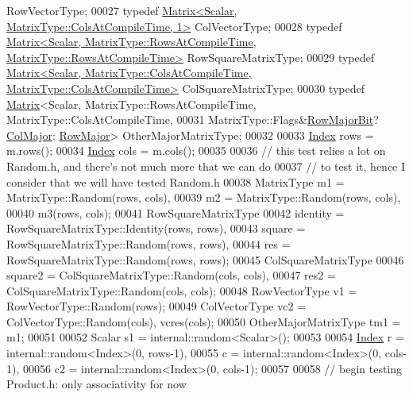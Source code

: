 \begin{DoxyCode}
      RowVectorType;
00027   \textcolor{keyword}{typedef} \hyperlink{group___core___module_class_eigen_1_1_matrix}{Matrix<Scalar, MatrixType::ColsAtCompileTime, 1>} 
      ColVectorType;
00028   \textcolor{keyword}{typedef} 
      \hyperlink{group___core___module_class_eigen_1_1_matrix}{Matrix<Scalar, MatrixType::RowsAtCompileTime, MatrixType::RowsAtCompileTime>}
       RowSquareMatrixType;
00029   \textcolor{keyword}{typedef} 
      \hyperlink{group___core___module_class_eigen_1_1_matrix}{Matrix<Scalar, MatrixType::ColsAtCompileTime, MatrixType::ColsAtCompileTime>}
       ColSquareMatrixType;
00030   \textcolor{keyword}{typedef} \hyperlink{group___core___module_class_eigen_1_1_matrix}{Matrix}<Scalar, MatrixType::RowsAtCompileTime, MatrixType::ColsAtCompileTime,
00031                          MatrixType::Flags&\hyperlink{group__flags_gae4f56c2a60bbe4bd2e44c5b19cbe8762}{RowMajorBit}?\hyperlink{group__enums_ggaacded1a18ae58b0f554751f6cdf9eb13a0cbd4bdd0abcfc0224c5fcb5e4f6669a}{ColMajor}:
      \hyperlink{group__enums_ggaacded1a18ae58b0f554751f6cdf9eb13acfcde9cd8677c5f7caf6bd603666aae3}{RowMajor}> OtherMajorMatrixType;
00032 
00033   \hyperlink{namespace_eigen_a62e77e0933482dafde8fe197d9a2cfde}{Index} rows = m.rows();
00034   \hyperlink{namespace_eigen_a62e77e0933482dafde8fe197d9a2cfde}{Index} cols = m.cols();
00035 
00036   \textcolor{comment}{// this test relies a lot on Random.h, and there's not much more that we can do}
00037   \textcolor{comment}{// to test it, hence I consider that we will have tested Random.h}
00038   MatrixType m1 = MatrixType::Random(rows, cols),
00039              m2 = MatrixType::Random(rows, cols),
00040              m3(rows, cols);
00041   RowSquareMatrixType
00042              identity = RowSquareMatrixType::Identity(rows, rows),
00043              square = RowSquareMatrixType::Random(rows, rows),
00044              res = RowSquareMatrixType::Random(rows, rows);
00045   ColSquareMatrixType
00046              square2 = ColSquareMatrixType::Random(cols, cols),
00047              res2 = ColSquareMatrixType::Random(cols, cols);
00048   RowVectorType v1 = RowVectorType::Random(rows);
00049   ColVectorType vc2 = ColVectorType::Random(cols), vcres(cols);
00050   OtherMajorMatrixType tm1 = m1;
00051 
00052   Scalar s1 = internal::random<Scalar>();
00053 
00054   \hyperlink{namespace_eigen_a62e77e0933482dafde8fe197d9a2cfde}{Index} r  = internal::random<Index>(0, rows-1),
00055         c  = internal::random<Index>(0, cols-1),
00056         c2 = internal::random<Index>(0, cols-1);
00057 
00058   \textcolor{comment}{// begin testing Product.h: only associativity for now}

\end{DoxyCode}
